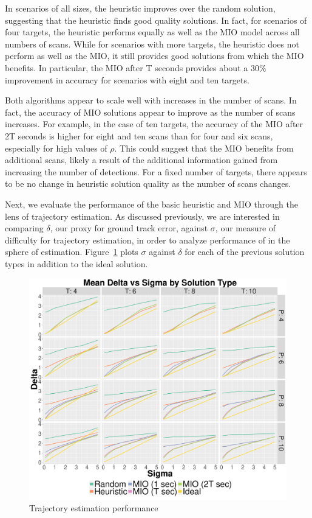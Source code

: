 In scenarios of all sizes, the heuristic improves over the random solution, suggesting that the heuristic finds good quality solutions. In fact, for scenarios of four targets, the heuristic performs equally as well as the MIO model across all numbers of scans. While for scenarios with more targets, the heuristic does not perform as well as the MIO, it still provides good solutions from which the MIO benefits. In particular, the MIO after T seconds provides about a $30\%$ improvement in accuracy for scenarios with eight and ten targets. 

Both algorithms appear to scale well with increases in the number of scans. In fact, the accuracy of MIO solutions appear to improve as the number of scans increases. For example, in the case of ten targets, the accuracy of the MIO after 2T seconds is higher for eight and ten scans than for four and six scans, especially for high values of $\rho$. This could suggest that the MIO benefits from additional scans, likely a result of the additional information gained from increasing the number of detections. For a fixed number of targets, there appears to be no change in heuristic solution quality as the number of scans changes. 

Next, we evaluate the performance of the basic heuristic and MIO through the lens of trajectory estimation. As discussed previously, we are interested in comparing $\delta$, our proxy for ground track error, against $\sigma$, our measure of difficulty for trajectory estimation, in order to analyze performance of in the sphere of estimation. Figure~\ref{Fig:Basic_Delta_Summary} plots $\sigma$ against $\delta$ for each of the previous solution types in addition to the ideal solution. 
\begin{figure}[ht]
  \centering
  \includegraphics[width=\columnwidth]{../Figures/Basic_Delta_Summary}
  \caption{Trajectory estimation performance}
  \label{Fig:Basic_Delta_Summary}
\end{figure}

